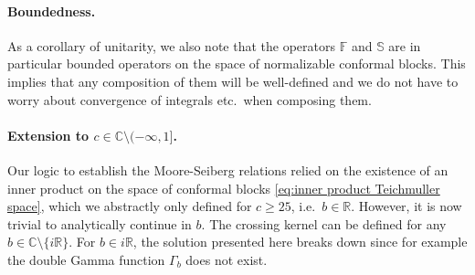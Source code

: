 \documentclass[12pt,a4paper]{article}
\newcommand\CC{\mathbb{C}}
\newcommand\RR{\mathbb{R}}
\begin{document}
\paragraph{Boundedness.} As a corollary of unitarity, we also note that the operators $\mathbb{F}$ and $\mathbb{S}$ are in particular bounded operators on the space of normalizable conformal blocks. This implies that any composition of them will be well-defined and we do not have to worry about convergence of integrals etc.\ when composing them.

\paragraph{Extension to $c \in \CC \setminus (-\infty,1]$.} Our logic to establish the Moore-Seiberg relations relied on the existence of an inner product on the space of conformal blocks \eqref{eq:inner product Teichmuller space}, which we abstractly only defined for $c \ge 25$, i.e.\ $b \in \RR$. However, it is now trivial to analytically continue in $b$. The crossing kernel can be defined for any $b \in \CC \setminus \{i \RR\}$. For $b \in i \RR$, the solution presented here breaks down since for example the double Gamma function $\Gamma_b$ does not exist.
\end{document}
